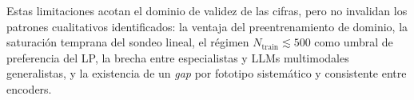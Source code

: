 Estas limitaciones acotan el dominio de validez de las cifras, pero
no invalidan los patrones cualitativos identificados: la ventaja del
preentrenamiento de dominio, la saturación temprana del sondeo
lineal, el régimen $N_{\mathrm{train}} \lesssim 500$ como umbral de
preferencia del LP, la brecha entre especialistas y LLMs
multimodales generalistas, y la existencia de un \emph{gap} por
fototipo sistemático y consistente entre encoders.
